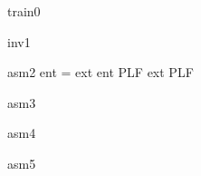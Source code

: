 \documentclass[12pt]{amsart}
\begin{document}
\begin{machine}{train0}
\begin{invariant}{inv1}
\end{invariant}

\begin{assumption}{asm2}
	\neg ent = ext \land \neg ent \in PLF \land \neg ext \in PLF
\end{assumption}

\begin{assumption}{asm3}
\end{assumption}

\begin{assumption}{asm4}
\end{assumption}

\begin{assumption}{asm5}
\end{assumption}

\end{machine}
\end{document}
